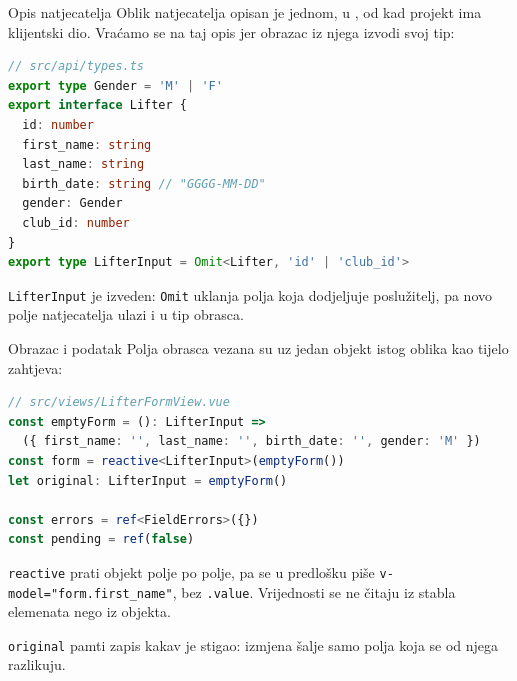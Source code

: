 \begin{frame}[fragile]{Opis natjecatelja}
Oblik natjecatelja opisan je jednom, u , od kad projekt ima klijentski dio. Vraćamo se na taj opis jer obrazac iz njega izvodi svoj tip:

\begin{lstlisting}[language=typescript]
// src/api/types.ts
export type Gender = 'M' | 'F'
export interface Lifter {
  id: number
  first_name: string
  last_name: string
  birth_date: string // "GGGG-MM-DD"
  gender: Gender
  club_id: number
}
export type LifterInput = Omit<Lifter, 'id' | 'club_id'>
\end{lstlisting}

\vspace{0.2em}
\texttt{LifterInput} je izveden: \texttt{Omit} uklanja polja koja dodjeljuje poslužitelj, pa novo polje natjecatelja ulazi i u tip obrasca.
\end{frame}

\begin{frame}[fragile]{Obrazac i podatak}
Polja obrasca vezana su uz jedan objekt istog oblika kao tijelo zahtjeva:

\begin{lstlisting}[language=typescript]
// src/views/LifterFormView.vue
const emptyForm = (): LifterInput =>
  ({ first_name: '', last_name: '', birth_date: '', gender: 'M' })
const form = reactive<LifterInput>(emptyForm())
let original: LifterInput = emptyForm()

const errors = ref<FieldErrors>({})
const pending = ref(false)
\end{lstlisting}

\vspace{0.3em}
\texttt{reactive} prati objekt polje po polje, pa se u predlošku piše \texttt{v-model="form.first\_name"}, bez \texttt{.value}. Vrijednosti se ne čitaju iz stabla elemenata nego iz objekta.

\vspace{0.3em}
\texttt{original} pamti zapis kakav je stigao: izmjena šalje samo polja koja se od njega razlikuju.
\end{frame}

